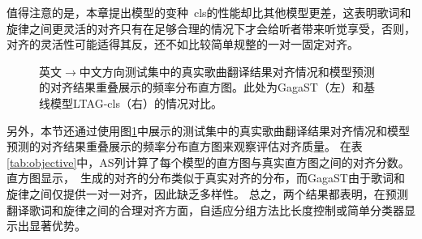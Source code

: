 值得注意的是，本章提出模型的变种\modelname~cls的性能却比其他模型更差，这表明歌词和旋律之间更灵活的对齐只有在足够合理的情况下才会给听者带来听觉享受，否则，对齐的灵活性可能适得其反，还不如比较简单规整的一对一固定对齐。
\begin{figure}[!h]
    \centering
\caption{英文$\rightarrow$中文方向测试集中的真实歌曲翻译结果对齐情况和模型预测的对齐结果重叠展示的频率分布直方图。此处为GagaST（左）和基线模型LTAG-cls（右）的情况对比。}
\label{fig:align_hist1}
\end{figure}
另外，本节还通过使用图\ref{fig:align_hist1}中展示的测试集中的真实歌曲翻译结果对齐情况和模型预测的对齐结果重叠展示的频率分布直方图来观察评估对齐质量。
在表\ref{tab:objective}中，AS列计算了每个模型的直方图与真实直方图之间的对齐分数。
直方图显示，\modelname~生成的对齐的分布类似于真实对齐的分布，而GagaST由于歌词和旋律之间仅提供一对一对齐，因此缺乏多样性。
总之，两个结果都表明，在预测翻译歌词和旋律之间的合理对齐方面，自适应分组方法比长度控制或简单分类器显示出显著优势。
